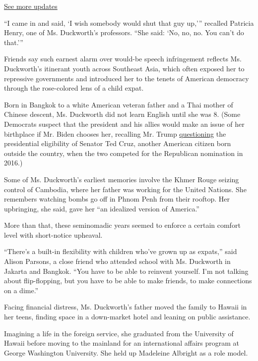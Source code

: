\href{https://www.nytimes.com/2020/07/31/us/elections/biden-vs-trump.html?action=click\&pgtype=Article\&state=default\&region=MAIN_CONTENT_1\&context=storylines_live_updates}{See
more updates}

``I came in and said, `I wish somebody would shut that guy up,'''
recalled Patricia Henry, one of Ms. Duckworth's professors. ``She said:
`No, no, no. You can't do that.'''

Friends say such earnest alarm over would-be speech infringement
reflects Ms. Duckworth's itinerant youth across Southeast Asia, which
often exposed her to repressive governments and introduced her to the
tenets of American democracy through the rose-colored lens of a child
expat.

Born in Bangkok to a white American veteran father and a Thai mother of
Chinese descent, Ms. Duckworth did not learn English until she was 8.
(Some Democrats suspect that the president and his allies would make an
issue of her birthplace if Mr. Biden chooses her, recalling Mr. Trump
\href{https://www.politico.com/story/2016/04/donald-trump-ted-cruz-canada-222347}{questioning}
the presidential eligibility of Senator Ted Cruz, another American
citizen born outside the country, when the two competed for the
Republican nomination in 2016.)

Some of Ms. Duckworth's earliest memories involve the Khmer Rouge
seizing control of Cambodia, where her father was working for the United
Nations. She remembers watching bombs go off in Phnom Penh from their
rooftop. Her upbringing, she said, gave her ``an idealized version of
America.''

More than that, these seminomadic years seemed to enforce a certain
comfort level with short-notice upheaval.

``There's a built-in flexibility with children who've grown up as
expats,'' said Alison Parsons, a close friend who attended school with
Ms. Duckworth in Jakarta and Bangkok. ``You have to be able to reinvent
yourself. I'm not talking about flip-flopping, but you have to be able
to make friends, to make connections on a dime.''

Facing financial distress, Ms. Duckworth's father moved the family to
Hawaii in her teens, finding space in a down-market hotel and leaning on
public assistance.

Imagining a life in the foreign service, she graduated from the
University of Hawaii before moving to the mainland for an international
affairs program at George Washington University. She held up Madeleine
Albright as a role model.

